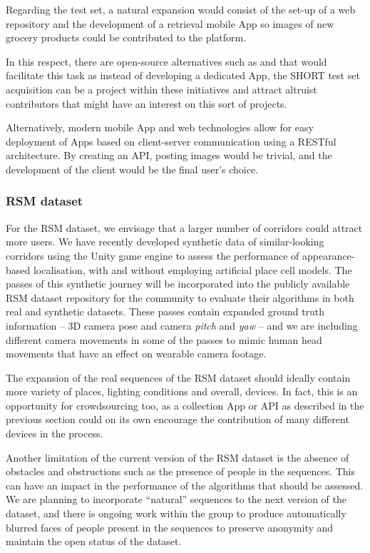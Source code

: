 Regarding the test set, a natural expansion would consist of the set-up of a web repository and the development of a retrieval mobile App so images of new grocery products could be contributed to the platform.

In this respect, there are open-source alternatives such as \cite{apple} and \cite{google} that would facilitate this task as instead of developing a dedicated App, the SHORT test set acquisition can be a project within these initiatives and attract altruist contributors that might have an interest on this sort of projects.

Alternatively, modern mobile App and web technologies allow for easy deployment of Apps based on client-server communication using a RESTful architecture. By creating an API, posting images would be trivial, and the development of the client would be the final user's choice.

\subsubsection{RSM dataset}
\label{sec:futureRSM}
For the RSM dataset, we envisage that a larger number of corridors could attract more users. We have recently developed synthetic data of similar-looking corridors using the Unity game engine to assess the performance of appearance-based localisation, with and without employing artificial place cell models. The passes of this synthetic journey will be incorporated into the publicly available RSM dataset repository for the community to evaluate their algorithms in both real and synthetic datasets. These passes contain expanded ground truth information -- 3D camera pose and camera \textit{pitch} and \textit{yaw} --  and we are including different camera movements in some of the passes to mimic human head movements that have an effect on wearable camera footage.

The expansion of the real sequences of the RSM dataset should ideally contain more variety of places, lighting conditions and overall, devices. In fact, this is an opportunity for crowdsourcing too, as a collection App or API as described in the previous section could on its own encourage the contribution of many different devices in the process. 

Another limitation of the current version of the RSM dataset is the absence of obstacles and obstructions such as the presence of people in the sequences. This can have an impact in the performance of the algorithms that should be assessed. We are planning to incorporate ``natural'' sequences to the next version of the dataset, and there is ongoing work within the group to produce automatically blurred faces of people present in the sequences to preserve anonymity and maintain the open status of the dataset.


